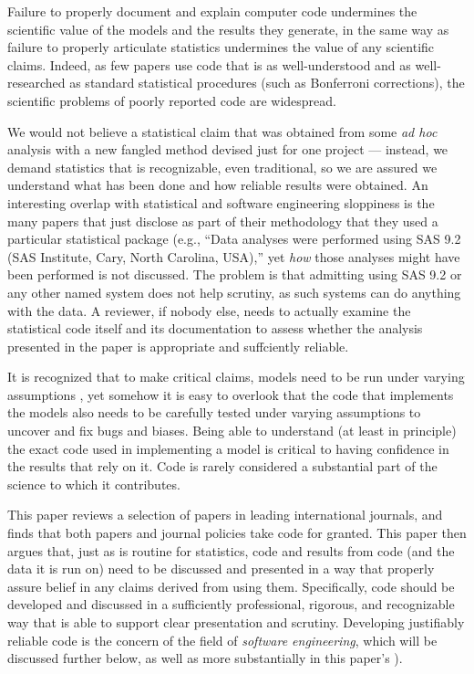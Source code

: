 \documentclass{comjnl}
\begin{document}
Failure to properly document and explain computer code undermines the scientific value of the models and the results they generate, in the same way as failure to properly articulate statistics undermines the value of any scientific claims. Indeed, as few papers use code that is as well-understood and as well-researched as standard statistical procedures (such as Bonferroni corrections), the scientific problems of poorly reported code are widespread. 


We would not believe a statistical claim that was obtained from some \emph{ad hoc\/} analysis with a new fangled method devised just for one project --- instead, we demand statistics that is recognizable, even traditional, so we are assured we understand what has been done and how reliable results were obtained. An interesting overlap with statistical and software engineering sloppiness is the many papers that just disclose as part of their methodology that they used a particular statistical package (e.g., ``Data analyses were performed using SAS 9.2 (SAS Institute, Cary, North Carolina, USA),'' yet \emph{how\/} those analyses might have been performed is not discussed. The problem is that admitting using SAS 9.2 or any other named system does not help scrutiny, as such systems can do anything with the data. A reviewer, if nobody else, needs to actually examine the statistical code itself and its documentation to assess whether the analysis presented in the paper is appropriate and suffciently reliable. 

It is recognized that to make critical claims, models need to be run under varying assumptions \cite{whitty}, yet somehow it is easy to overlook that the code that implements the models also needs to be carefully tested under varying assumptions to uncover and fix bugs and biases. Being able to understand (at least in principle) the exact code used in implementing a model is critical to having confidence in the results that rely on it. Code is rarely considered a substantial part of the science to which it contributes. 

This paper reviews a selection of papers in leading international journals, and finds that both papers and journal policies take code for granted. This paper then argues that, just as is routine for statistics, code and results from code (and the data it is run on) need to be discussed and presented in a way that properly assure belief in any claims derived from using them. Specifically, code should be developed and discussed in a sufficiently professional, rigorous, and recognizable way that is able to support clear presentation and scrutiny. Developing justifiably reliable code is the concern of the field of \emph{software engineering}, which will be discussed further below, as well as more substantially in this paper's \supplement). 
\end{document}
